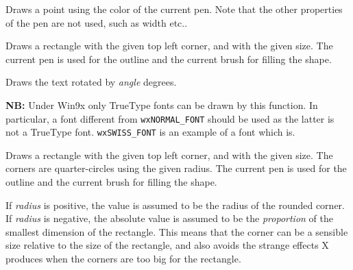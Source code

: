 


\label{wxdcdrawpoint}


Draws a point using the color of the current pen. Note that the other properties of the pen are not used, such as width etc..


\label{wxdcdrawrectangle}


Draws a rectangle with the given top left corner, and with the given
size.  The current pen is used for the outline and the current brush
for filling the shape.


\label{wxdcdrawrotatedtext}


Draws the text rotated by {\it angle} degrees.

{\bf NB:} Under Win9x only TrueType fonts can be drawn by this function. In
particular, a font different from {\tt wxNORMAL\_FONT} should be used as the
latter is not a TrueType font. {\tt wxSWISS\_FONT} is an example of a font
which is.




\label{wxdcdrawroundedrectangle}


Draws a rectangle with the given top left corner, and with the given
size.  The corners are quarter-circles using the given radius. The
current pen is used for the outline and the current brush for filling
the shape.

If {\it radius} is positive, the value is assumed to be the
radius of the rounded corner. If {\it radius} is negative,
the absolute value is assumed to be the {\it proportion} of the smallest
dimension of the rectangle. This means that the corner can be
a sensible size relative to the size of the rectangle, and also avoids
the strange effects X produces when the corners are too big for
the rectangle.


